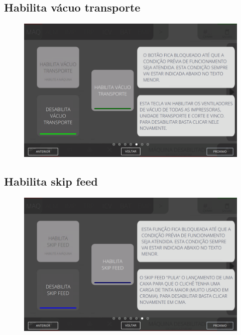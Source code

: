 \subsection{Habilita vácuo transporte}
\begin{figure}
    \centering
    \includegraphics[width=576 px,height=360 px]{src/imagesICV/02-machine/6.png}
\end{figure}
\newpage
\thispagestyle{fancy}
\vspace{\fill}

\subsection{Habilita skip feed}
\begin{figure}
    \centering
    \includegraphics[width=576 px,height=360 px]{src/imagesICV/02-machine/7.png}
\end{figure}
\newpage
\thispagestyle{fancy}
\vspace{\fill}

